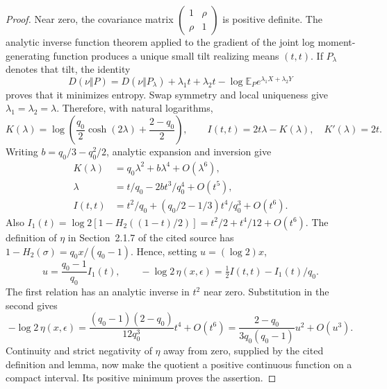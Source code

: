 \documentclass[11pt]{article}
\begin{document}
\begin{proof}
Near zero, the covariance matrix
$\left(\begin{smallmatrix}1&\rho\\\rho&1\end{smallmatrix}\right)$
is positive definite. The analytic inverse function theorem applied to
the gradient of the joint log moment-generating function produces a unique
small tilt realizing means $(t,t)$. If $P_\lambda$ denotes that tilt,
the identity
\[
 D(\nu\Vert P)=D(\nu\Vert P_\lambda)
  +\lambda_1t+\lambda_2t-\log\mathbb E_Pe^{\lambda_1X+\lambda_2Y}
\]
proves that it minimizes entropy. Swap symmetry and local uniqueness
give $\lambda_1=\lambda_2=\lambda$. Therefore, with natural logarithms,
\[
 K(\lambda)=\log\left(\frac{q_0}{2}\cosh(2\lambda)
                          +\frac{2-q_0}{2}\right),\qquad
 I(t,t)=2t\lambda-K(\lambda),\quad K'(\lambda)=2t.
\]
Writing $b=q_0/3-q_0^2/2$, analytic expansion and inversion give
\begin{align*}
 K(\lambda)&=q_0\lambda^2+b\lambda^4+O(\lambda^6),\\
 \lambda&=t/q_0-2bt^3/q_0^4+O(t^5),\\
 I(t,t)&=t^2/q_0+(q_0/2-1/3)t^4/q_0^3+O(t^6).
\end{align*}
Also $I_1(t)=\log2[1-H_2((1-t)/2)]=t^2/2+t^4/12+O(t^6)$.
The definition of $\eta$ in Section~2.1.7 of the cited source has
$1-H_2(\sigma)=q_0x/(q_0-1)$. Hence, setting $u=(\log2)x$,
\[
 u=\frac{q_0-1}{q_0}I_1(t),\qquad
 -\log2\,\eta(x,\epsilon)=\tfrac12 I(t,t)-I_1(t)/q_0.
\]
The first relation has an analytic inverse in $t^2$ near zero. Substitution
in the second gives
\[
 -\log2\,\eta(x,\epsilon)
 =\frac{(q_0-1)(2-q_0)}{12q_0^3}t^4+O(t^6)
 =\frac{2-q_0}{3q_0(q_0-1)}u^2+O(u^3).
\]
Continuity and strict negativity of $\eta$ away from zero, supplied by
the cited definition and lemma, now make the quotient a positive
continuous function on a compact interval. Its positive minimum proves
the assertion.
\end{proof}
\end{document}
